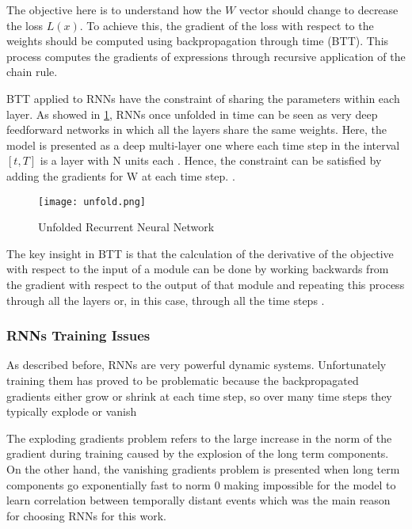 The objective here is to understand how the $W$ vector should change to decrease the loss $L(x)$. To achieve this, the gradient of the loss with respect to the weights should be computed using backpropagation through time (BTT). This process computes the gradients of expressions through recursive application of the chain rule. 

BTT applied to RNNs have the constraint of sharing the parameters within each layer. As showed in  \ref{fig:unfold}, RNNs once unfolded in time can be seen as very deep feedforward networks in which all the layers share the same weights\cite{lecun2015deep}. Here, the model is presented as a deep multi-layer one where each time step in the interval $[t,T]$ is a layer with N units each \cite{pascanu2013difficulty}. Hence, the constraint can be satisfied by adding the gradients for W at each time step.  .

\begin{figure}
\label{fig:unfold}
\center
\texttt{[image: unfold.png]}
\caption{Unfolded Recurrent Neural Network}
\end{figure}

The key insight in BTT is that the calculation of the derivative of the objective with respect to the input of a module can be done by working backwards from the gradient with respect to the output of that module and repeating this process through all the layers or, in this case, through all the time steps \cite{schmidhuber2015deep}.

\subsubsection{RNNs Training Issues}
As described before, RNNs are very powerful dynamic systems. Unfortunately training them has proved to be problematic because the backpropagated gradients either grow or shrink at each time step, so over many time steps they typically explode or vanish\cite{lecun2015deep}

The exploding gradients problem refers to the large increase in the norm of the gradient during training caused by the explosion of the long term components. On the other hand, the vanishing gradients problem is presented when long term components go exponentially fast to norm 0 making impossible for the model to learn correlation between temporally distant events \cite{pascanu2013difficulty} which was the main reason for choosing RNNs for this work. 

